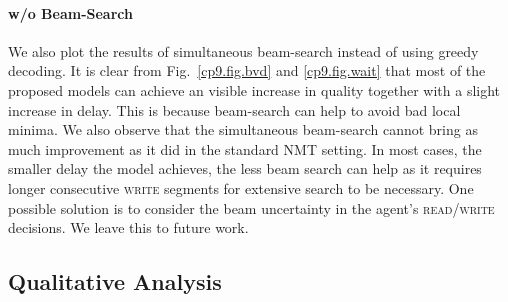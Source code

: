 \paragraph{w/o Beam-Search}
We also plot the results of simultaneous beam-search instead of using greedy decoding. 
It is clear from Fig.~\ref{cp9.fig.bvd} and \ref{cp9.fig.wait} that most of the proposed models can achieve an visible increase in quality together with a slight increase in delay. 
This is because beam-search can help to avoid bad local minima.  %
We also observe that the simultaneous beam-search cannot bring as much improvement as it did in the standard NMT setting. In most cases, the smaller delay the model achieves, the less beam search can help as it requires longer consecutive \textsc{write} segments for extensive search to be necessary.
One possible solution is to consider the beam uncertainty in the agent's \textsc{read/write} decisions. We leave this to future work. 

\subsection{Qualitative Analysis}





